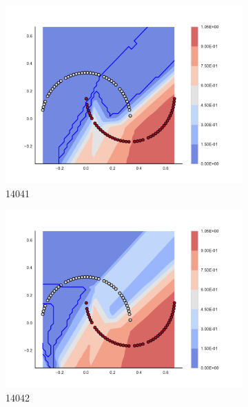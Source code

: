 \begin{figure}[h]
\begin{subfigure}[b]{0.09\textwidth}
    \includegraphics[clip, trim=2.35cm 1.75cm 4.5cm 0cm,width=\textwidth]{img/convergence/14041.pdf}
    \caption{14041}
    \label{fig:convergence_14041}
\end{subfigure}
%
\begin{subfigure}[b]{0.09\textwidth}
    \includegraphics[clip, trim=2.35cm 1.75cm 4.5cm 0cm,width=\textwidth]{img/convergence/14042.pdf}
    \caption{14042}
    \label{fig:convergence_14042}
\end{subfigure}
%
\begin{subfigure}[b]{0.09\textwidth}

\end{subfigure}
\end{figure}
